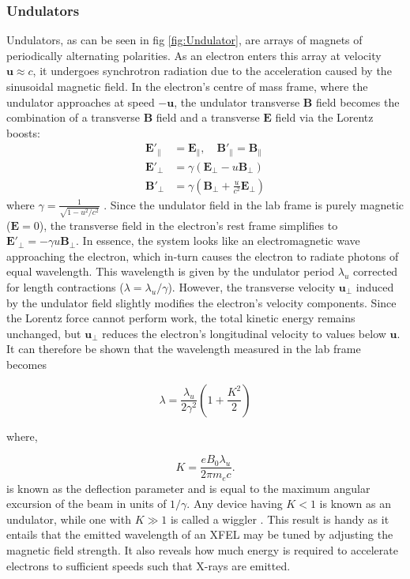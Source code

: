 \documentclass[aps,prb,twocolumn,superscriptaddress]{revtex4-2}
\begin{document}
\subsubsection{Undulators}
Undulators, as can be seen in fig \ref{fig:Undulator}, are 
arrays of magnets of periodically alternating polarities. As an electron enters
this array at velocity $\textbf{u} \approx c$, it undergoes synchrotron 
radiation due to the acceleration caused by the sinusoidal magnetic field. In
the electron's centre of mass frame, where the undulator approaches at speed
$-\textbf{u}$, the undulator transverse $\textbf{B}$ field becomes the
combination of a transverse $\textbf{B}$ field and a transverse $\textbf{E}$
field via the Lorentz boosts:
\begin{align}
\mathbf{E}'_{\parallel} &= \mathbf{E}_{\parallel}, \quad \mathbf{B}'_{\parallel} = \mathbf{B}_{\parallel} \\
\mathbf{E}'_{\perp} &= \gamma (\mathbf{E}_{\perp} - u \mathbf{B}_{\perp}) \\
\mathbf{B}'_{\perp} &= \gamma \left( \mathbf{B}_{\perp} + \frac{u}{c^2} \mathbf{E}_{\perp} \right)
\end{align}
where $\gamma = \frac{1}{\sqrt{1 - u^2/c^2}}$ . Since the undulator field in
the lab frame is purely magnetic ($\textbf{E} = 0$), the transverse field in
the electron's rest frame simplifies to $\mathbf{E}'_{\perp} = - \gamma u
\mathbf{B}_{\perp}$. In essence, the system looks like an electromagnetic wave
approaching the electron, which in-turn causes the electron to radiate photons
of equal wavelength. This wavelength is given by the undulator period
$\lambda_u$ corrected for length contractions ($\lambda = \lambda_u/\gamma$).
However, the transverse velocity $\textbf{u}_{\perp}$ induced by the undulator
field slightly modifies the electron’s velocity components. Since the Lorentz
force cannot perform work, the total kinetic energy remains unchanged, but
$\textbf{u}_{\perp}$ reduces the electron’s longitudinal velocity to values
below $\textbf{u}$. It can therefore be shown that the wavelength measured in 
the lab frame becomes

\begin{equation}\label{equation: XFEL wl}
    \lambda = \frac{\lambda_u}{2\gamma^2}\left(1 + \frac{K^2}{2} \right)
\end{equation}

where,

\begin{equation}
    K = \frac{eB_0\lambda_u}{2\pi m_e c}.
\end{equation}
is known as the deflection parameter and is equal to the maximum angular
excursion of the beam in units of $1/\gamma$. Any device having $K < 1$ is
known as an undulator, while one with $K \gg 1$ is called a wiggler
\cite{CERN}. This result is handy as it
entails that the emitted wavelength of an XFEL may be tuned by adjusting the
magnetic field strength. It also reveals how much 
energy is required to accelerate electrons to sufficient speeds such that 
X-rays are emitted. 
    
\end{document}
